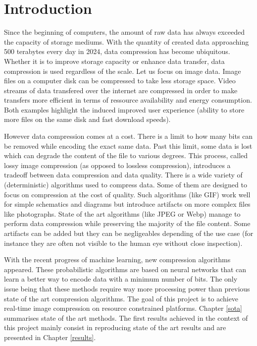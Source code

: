 \chapter*{Introduction}
Since the beginning of computers, the amount of raw data has always exceeded the capacity of storage mediums. With the quantity of created data approaching 500 terabytes every day in 2024, data compression has become ubiquitous. Whether it is to improve storage capacity or enhance data transfer, data compression is used regardless of the scale. Let us focus on image data. Image files on a computer disk can be compressed to take less storage space. Video streams of data transfered over the internet are compressed in order to make transfers more efficient in terms of ressource availability and energy consumption. Both examples highlight the induced improved user experience (ability to store more files on the same disk and fast download speeds).

However data compression comes at a cost. There is a limit to how many bits can be removed while encoding the exact same data. Past this limit, some data is lost which can degrade the content of the file to various degrees. This process, called lossy image compression (as opposed to lossless compression), introduces a tradeoff between data compression and data quality. There is a wide variety of (deterministic) algorithms used to compress data. Some of them are designed to focus on compression at the cost of quality. Such algorithms (like GIF) work well for simple schematics and diagrams but introduce artifacts on more complex files like photographs. State of the art algorithms (like JPEG or Webp) manage to perform data compression while preserving the majority of the file content. Some artifacts can be added but they can be negligeables depending of the use case (for instance they are often not visible to the human eye without close inspection).

With the recent progress of machine learning, new compression algorithms appeared. These probabilistic algorithms are based on neural networks that can learn a better way to encode data with a minimum number of bits. The only issue being that these methods require way more processing power than previous state of the art compression algorithms. The goal of this project is to achieve real-time image compression on resource constrained platforms. Chapter \ref{sota} summarises state of the art methods. The first results achieved in the context of this project mainly consist in reproducing state of the art results and are presented in Chapter \ref{results}.
